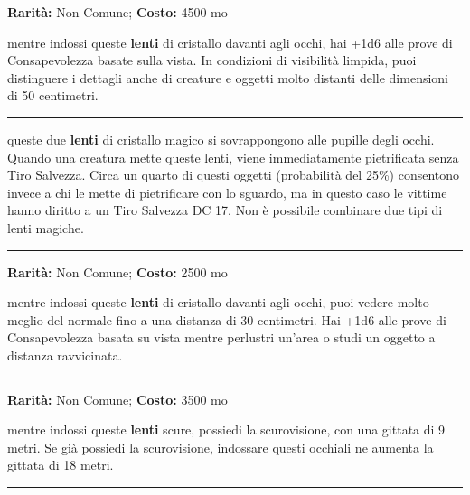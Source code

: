 \begin{multicols}{2}
\textbf{Rarità:} Non Comune; \textbf{Costo:} 4500 mo

mentre indossi queste \textbf{lenti} di cristallo davanti agli occhi, hai +1d6 alle prove di Consapevolezza basate sulla vista. In condizioni di visibilità limpida, puoi distinguere i dettagli anche di creature e oggetti molto distanti delle dimensioni di 50 centimetri.

\smallskip\noindent\rule{\linewidth}{2pt}  \hypertarget{Occhidellapietrificazione}{}\medskip{}\noindent\label{Occhidellapietrificazione}

queste due \textbf{lenti} di cristallo magico si sovrappongono alle pupille degli occhi. Quando una creatura mette queste lenti, viene immediatamente pietrificata senza Tiro Salvezza. Circa un quarto di questi oggetti (probabilità del 25\%) consentono invece a chi le mette di pietrificare con lo sguardo, ma in questo caso le vittime hanno diritto a un Tiro Salvezza DC 17. Non è possibile combinare due tipi di lenti magiche.

\smallskip\noindent\rule{\linewidth}{2pt}  \hypertarget{OcchidellaVistaDettagliata}{}\medskip{}\noindent\label{OcchidellaVistaDettagliata}

\textbf{Rarità:} Non Comune; \textbf{Costo:} 2500 mo

mentre indossi queste \textbf{lenti} di cristallo davanti agli occhi, puoi vedere molto meglio del normale fino a una distanza di 30 centimetri. Hai +1d6 alle prove di Consapevolezza basata su vista mentre perlustri un'area o studi un oggetto a distanza ravvicinata.

\smallskip\noindent\rule{\linewidth}{2pt}  \hypertarget{OcchialidaNotte}{}\medskip{}\noindent\label{OcchialidaNotte}

\textbf{Rarità:} Non Comune; \textbf{Costo:} 3500 mo

mentre indossi queste \textbf{lenti} scure, possiedi la scurovisione, con una gittata di 9 metri. Se già possiedi la scurovisione, indossare questi occhiali ne aumenta la gittata di 18 metri.

\smallskip\noindent\rule{\linewidth}{2pt}  \hypertarget{OliodiAffilatezza}{}\medskip{}\noindent\label{OliodiAffilatezza}


\end{multicols}

